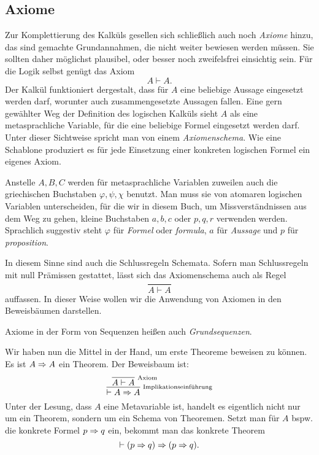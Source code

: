 \subsection{Axiome}

Zur Komplettierung des Kalküls gesellen sich schließlich auch noch
\emph{Axiome} hinzu, das sind gemachte Grundannahmen, die
nicht weiter bewiesen werden müssen. Sie sollten daher möglichst
plausibel, oder besser noch zweifelsfrei einsichtig sein. Für die Logik
selbst genügt das Axiom
\[A\vdash A.\]
Der Kalkül funktioniert dergestalt, dass für $A$ eine beliebige Aussage
eingesetzt werden darf, worunter auch zusammengesetzte Aussagen
fallen. Eine gern gewählter Weg der Definition des logischen
Kalküls sieht $A$ als eine metasprachliche Variable, für die eine
beliebige Formel eingesetzt werden darf. Unter dieser Sichtweise
spricht man von einem \emph{Axiomenschema}. Wie
eine Schablone produziert es für jede Einsetzung einer konkreten
logischen Formel ein eigenes Axiom.

Anstelle $A,B,C$ werden für metasprachliche Variablen zuweilen auch
die griechischen Buchstaben $\varphi,\psi,\chi$ benutzt. Man muss sie
von atomaren logischen Variablen unterscheiden, für die wir in diesem
Buch, um Missverständnissen aus dem Weg zu gehen, kleine Buchstaben
$a,b,c$ oder $p,q,r$ verwenden werden. Sprachlich suggestiv steht
$\varphi$ für \emph{Formel} oder \emph{formula}, $a$ für
\emph{Aussage} und $p$ für \emph{proposition}.

In diesem Sinne sind auch die Schlussregeln Schemata. Sofern man
Schlussregeln mit null Prämissen gestattet, lässt sich das
Axiomenschema auch als Regel
\[\dfrac{}{A\vdash A}\]
auffassen. In dieser Weise wollen wir die Anwendung von Axiomen in den
Beweisbäumen darstellen.

Axiome in der Form von Sequenzen heißen auch
\emph{Grundsequenzen}.

Wir haben nun die Mittel in der Hand, um erste Theoreme beweisen
zu können. Es ist $A\Rightarrow A$ ein Theorem. Der Beweisbaum ist:
\[
\infer[\infernote{Implikationseinführung}]{\vdash A\cond A}{
  \infer[\infernote{Axiom}]{A\vdash A}{}}
\]
Unter der Lesung, dass $A$ eine Metavariable ist, handelt es
eigentlich nicht nur um ein Theorem, sondern um ein Schema von
Theoremen. Setzt man für $A$ bspw. die konkrete
Formel $p\Rightarrow q$ ein, bekommt man das konkrete Theorem
\[\vdash (p\Rightarrow q)\Rightarrow (p\Rightarrow q).\]

